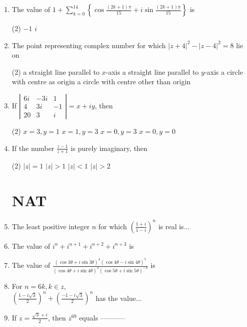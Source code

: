 \begin{enumerate}
\begin{tasks}
	\end{tasks}
	\item The value of $1+\sum_{k=0}^{14}\left\{\cos \frac{(2 k+1) \pi}{15}+i \sin \frac{(2 k+1) \pi}{15}\right\}$ is
	 \begin{tasks}(2)
		\task[\textbf{b.}] $-1$
		\task[\textbf{d.}] $i$
	\end{tasks}
	\item The point representing complex number for which $|z+4|^{2}-|z-4|^{2}=8$ lie on
	 \begin{tasks}(2)
		\task[\textbf{a.}]a straight line parallel to $x$-axis
		\task[\textbf{b.}]a straight line parallel to $y$-axis
		\task[\textbf{c.}]a circle with centre as origin
		\task[\textbf{d.}] a circle with centre other than origin
	\end{tasks}
	\item If $\left|\begin{array}{ccc}6 i & -3 i & 1 \\ 4 & 3 i & -1 \\ 20 & 3 & i\end{array}\right|=x+i y$, then
	 \begin{tasks}(2)
		\task[\textbf{a.}] $x=3, y=1$
		\task[\textbf{b.}] $x=1, y=3$
		\task[\textbf{c.}]$x=0, y=3$
		\task[\textbf{d.}]  $x=0, y=0$
	\end{tasks}
	\item If the number $\frac{z-1}{z+1}$ is purely imaginary, then
	 \begin{tasks}(2)
		\task[\textbf{a.}]$|z|=1$
		\task[\textbf{b.}]$|z|>1$
		\task[\textbf{c.}]$|z|<1$
		\task[\textbf{d.}] $|z|>2$
	\end{tasks}
	\section{NAT}
	\item The least positive integer $n$ for which $\left(\frac{1+i}{1-i}\right)^{n}$ is real is...
	\item The value of $i^{n}+i^{n+1}+i^{n+2}+i^{n+3}$ is
	\item The value of $\frac{(\cos 3 \theta+i \sin 3 \theta)^{4}(\cos 4 \theta-i \sin 4 \theta)^{5}}{(\cos 4 \theta+i \sin 4 \theta)^{3}(\cos 5 \theta+i \sin 5 \theta)^{-4}}$ is
	\item For $n=6 k, k \in z$,\\
	$\left(\frac{1-i \sqrt{3}}{2}\right)^{n}+\left(\frac{-1-i \sqrt{3}}{2}\right)^{n}$ has the value...
	\item If $z=\frac{\sqrt{3}+i}{2}$, then $z^{69}$ equals -----------

\end{enumerate}

